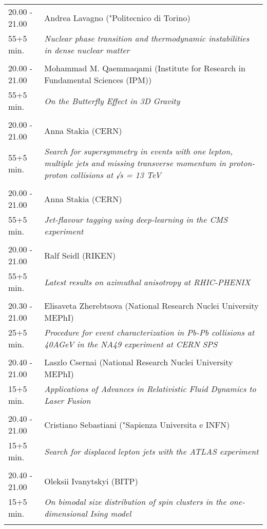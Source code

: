 \begin{longtable}{p{3cm}p{13cm}}
20.00 - 21.00 & Andrea Lavagno ("Politecnico di Torino)\\ 
55+5 min. & {\it Nuclear phase transition and thermodynamic instabilities in dense nuclear matter}\\ 
 & \\ 
20.00 - 21.00 & Mohammad M. Qaemmaqami (Institute for Research in Fundamental Sciences (IPM))\\ 
55+5 min. & {\it On the Butterfly Effect in 3D Gravity}\\ 
 & \\ 
20.00 - 21.00 & Anna Stakia (CERN)\\ 
55+5 min. & {\it Search for supersymmetry in events with one lepton, multiple jets and missing transverse momentum in proton-proton collisions at √s = 13 TeV}\\ 
 & \\ 
20.00 - 21.00 & Anna Stakia (CERN)\\ 
55+5 min. & {\it Jet-flavour tagging using deep-learning in the CMS experiment}\\ 
 & \\ 
20.00 - 21.00 & Ralf Seidl (RIKEN)\\ 
55+5 min. & {\it Latest results on azimuthal anisotropy at RHIC-PHENIX}\\ 
 & \\ 
20.30 - 21.00 & Elisaveta Zherebtsova (National Research Nuclei University MEPhI)\\ 
25+5 min. & {\it Procedure for event characterization in Pb-Pb collisions at 40AGeV in the NA49 experiment at CERN SPS}\\ 
 & \\ 
20.40 - 21.00 & Laszlo Csernai (National Research Nuclei University MEPhI)\\ 
15+5 min. & {\it Applications of Advances in Relativistic Fluid Dynamics to Laser Fusion}\\ 
 & \\ 
20.40 - 21.00 & Cristiano Sebastiani ("Sapienza Universita e INFN)\\ 
15+5 min. & {\it Search for displaced lepton jets with the ATLAS experiment}\\ 
 & \\ 
20.40 - 21.00 & Oleksii Ivanytskyi (BITP)\\ 
15+5 min. & {\it On bimodal size distribution of spin clusters in the one-dimensional Ising model}\\ 
 & \\ 
\end{longtable}

